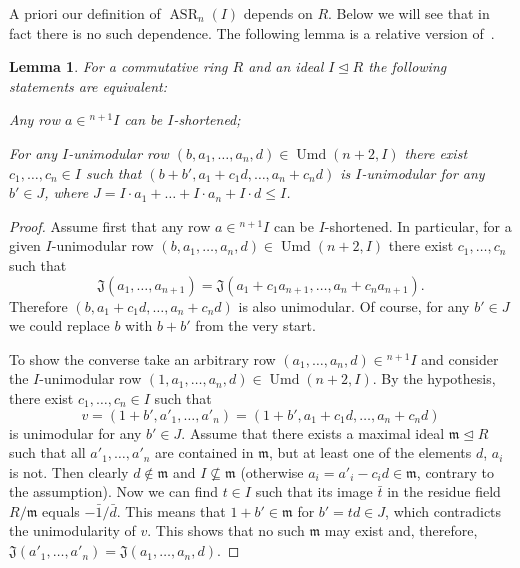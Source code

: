 \documentclass[11pt]{amsart}
\theoremstyle{plain}
\numberwithin{equation}{section}
\newtheorem{lemma}{Lemma}
\numberwithin{lemma}{section}
\theoremstyle{definition}
\theoremstyle{remark}
\DeclareMathOperator{\ASR}{ASR}
\DeclareMathOperator{\Umd}{Umd}
\begin{document}
A priori our definition of $\ASR_n(I)$ depends on $R$.
Below we will see that in fact there is no such dependence.
The following lemma is a relative version of~\cite[Lemma~8.2]{MKV}. 
\begin{lemma}\label{lemma:relative-asr-unimod}
For a commutative ring $R$ and an ideal $I \trianglelefteq R$ the following statements are equivalent:
\begin{lemlist} 
\item\label{asr-j-stable} Any row $a\in{}^{n+1}\!I$ can be $I$-shortened;
\item\label{asr-bak-like} For any $I$-unimodular row $(b, a_1, \ldots, a_n, d)\in\Umd(n+2, I)$ there exist $c_1, \ldots, c_n\in I$ 
 such that $(b+b', a_1+c_1d, \ldots, a_n+c_nd)$ is $I$-unimodular for any $b'\in J$, where $J=I \cdot a_1 + \ldots + I \cdot a_n + I \cdot d\leqslant I$.
\end{lemlist} 
\end{lemma}
\begin{proof}
Assume first that any row $a\in{}^{n+1}\!I$ can be $I$-shortened. 
In particular, for a given $I$-unimodular row $(b, a_1, \ldots, a_n, d)\in\Umd(n+2, I)$ there exist $c_1, \ldots, c_n$ such that
\[\mathfrak{J}(a_1, \ldots, a_{n+1})=\mathfrak{J}(a_1+c_1a_{n+1}, \ldots, a_n+c_na_{n+1}).\]
Therefore $(b,a_1+c_1d,\ldots,a_n+c_nd)$ is also unimodular. Of course, for any $b'\in J$ we could replace $b$ with $b+b'$ from the very start.

To show the converse take an arbitrary row $(a_1, \ldots, a_n, d)\in{}^{n+1}\!I$ and consider the $I$-unimodular row $(1, a_1, \ldots, a_n, d)\in\Umd(n+2, I).$
By the hypothesis, there exist $c_1, \ldots, c_n\in I$ such that
\[ v=(1+b', a'_1, \ldots, a'_n)=(1+b', a_1+c_1d, \ldots, a_n+c_nd) \]
is unimodular for any $b'\in J$.
Assume that there exists a maximal ideal $\mathfrak{m}\trianglelefteq R$ such that all $a'_1, \ldots, a'_n$ are contained in $\mathfrak{m}$, but at least one of the elements $d$, $a_i$ is not.
Then clearly $d\notin\mathfrak{m}$ and $I\not\subseteq \mathfrak{m}$ (otherwise $a_i=a'_i-c_id\in\mathfrak{m}$, contrary to the assumption).
Now we can find $t\in I$ such that its image $\bar{t}$ in the residue field $R/\mathfrak{m}$ equals $-\bar{1}/\bar{d}$.
This means that $1 + b' \in \mathfrak{m}$ for $b'=td\in J$, which contradicts the unimodularity of $v$.
This shows that no such $\mathfrak{m}$ may exist and, therefore, $\mathfrak{J}(a'_1, \ldots, a'_n)=\mathfrak{J}(a_1, \ldots, a_n, d)$.
\end{proof}
\end{document}
